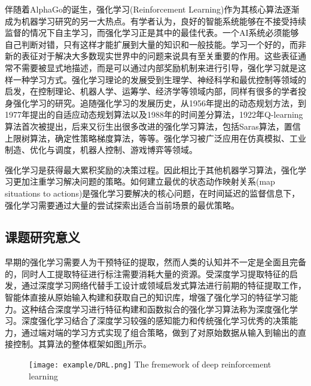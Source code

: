 伴随着AlphaGo的诞生，强化学习(Reinforcement Learning)作为其核心算法逐渐成为机器学习研究的另一大热点。有学者认为，良好的智能系统能够在不接受持续监督的情况下自主学习，而强化学习正是其中的最佳代表。一个AI系统必须能够自己判断对错，只有这样才能扩展到大量的知识和一般技能。学习一个好的，而非新的表征对于解决大多数现实世界中的问题来说具有至关重要的作用。这些表征通常不需要被显式地描述，而是可以通过内部奖励机制来进行引导，强化学习就是这样一种学习方式。强化学习理论的发展受到生理学、神经科学和最优控制等领域的启发，在控制理论、机器人学、运筹学、经济学等领域内部，同样有很多的学者投身强化学习的研究。追随强化学习的发展历史，从1956年提出的动态规划方法，到1977年提出的自适应动态规划算法以及1988年的时间差分算法，1922年Q-learning算法首次被提出，后来又衍生出很多改进的强化学习算法，包括Saras算法，置信上限树算法，确定性策略梯度算法，等等。强化学习被广泛应用在仿真模拟\cite{傅启明2014一种基于线性函数逼近的离策略}、工业制造\cite{高阳2007平均奖赏强化学习算法研究}、优化与调度\cite{魏英姿2005一种基于强化学习的作业车间动态调度方法}，机器人控制\cite{Ipek2008Self}、游戏博弈\cite{Tesauro1944TD}等领域。

强化学习是获得最大累积奖励的决策过程。因此相比于其他机器学习算法，强化学习更加注重学习解决问题的策略。如何建立最优的状态动作映射关系(map situations to actions)是强化学习要解决的核心问题，在时间延迟的监督信息下，强化学习需要通过大量的尝试探索出适合当前场景的最优策略。

\subsection{课题研究意义}
早期的强化学习需要人为干预特征的提取，然而人类的认知并不一定是全面且完备的，同时人工提取特征进行标注需要消耗大量的资源。受深度学习提取特征的启发，通过深度学习网络代替手工设计或领域启发式算法进行前期的特征提取工作，智能体直接从原始输入构建和获取自己的知识库，增强了强化学习的特征学习能力。这种结合深度学习进行特征构建和函数拟合的强化学习算法称为深度强化学习。深度强化学习结合了深度学习较强的感知能力和传统强化学习优秀的决策能力，通过端对端的学习方式实现了组合策略，做到了对原始数据从输入到输出的直接控制。其算法的整体框架如图\ref{fig:DRL}所示。
\begin{figure}[htbp]
	\centering
	\texttt{[image: example/DRL.png]}
	{The fremework of deep reinforcement learning}
	\label{fig:DRL}
\end{figure}

